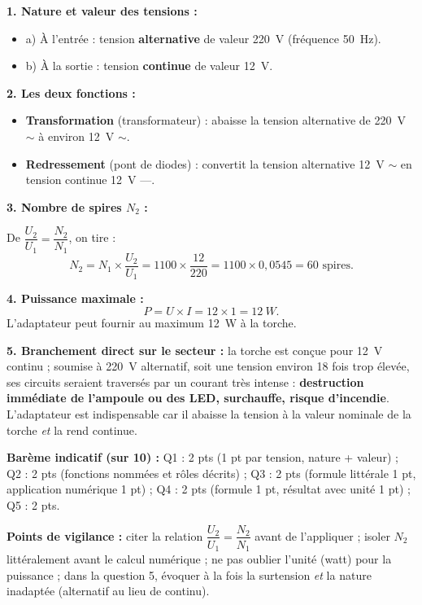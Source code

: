 \documentclass[11pt]{article}
\begin{document}
\begin{corrige}
\textbf{1. Nature et valeur des tensions :}
\begin{itemize}
\item a) À l'entrée : tension \textbf{alternative} de valeur \SI{220}{V} (fréquence \SI{50}{Hz}).
\item b) À la sortie : tension \textbf{continue} de valeur \SI{12}{V}.
\end{itemize}

\textbf{2. Les deux fonctions :}
\begin{itemize}
\item \textbf{Transformation} (transformateur) : abaisse la tension alternative de \SI{220}{V} $\sim$ à environ \SI{12}{V} $\sim$.
\item \textbf{Redressement} (pont de diodes) : convertit la tension alternative \SI{12}{V} $\sim$ en tension continue \SI{12}{V} $\text{---}$.
\end{itemize}

\textbf{3. Nombre de spires $N_2$ :}

De $\dfrac{U_2}{U_1} = \dfrac{N_2}{N_1}$, on tire :
\[
N_2 = N_1 \times \frac{U_2}{U_1} = 1100 \times \frac{12}{220} = 1100 \times 0{,}0545 = 60 \text{ spires}.
\]

\textbf{4. Puissance maximale :}
\[
P = U \times I = 12 \times 1 = \SI{12}{W}.
\]
L'adaptateur peut fournir au maximum \SI{12}{W} à la torche.

\textbf{5. Branchement direct sur le secteur :} la torche est conçue pour \SI{12}{V} continu ; soumise à \SI{220}{V} alternatif, soit une tension environ 18 fois trop élevée, ses circuits seraient traversés par un courant très intense : \textbf{destruction immédiate de l'ampoule ou des LED, surchauffe, risque d'incendie}. L'adaptateur est indispensable car il abaisse la tension à la valeur nominale de la torche \emph{et} la rend continue.

\medskip
\textbf{Barème indicatif (sur 10) :} Q1 : 2 pts (1 pt par tension, nature + valeur) ; Q2 : 2 pts (fonctions nommées et rôles décrits) ; Q3 : 2 pts (formule littérale 1 pt, application numérique 1 pt) ; Q4 : 2 pts (formule 1 pt, résultat avec unité 1 pt) ; Q5 : 2 pts.

\textbf{Points de vigilance :} citer la relation $\dfrac{U_2}{U_1} = \dfrac{N_2}{N_1}$ avant de l'appliquer ; isoler $N_2$ littéralement avant le calcul numérique ; ne pas oublier l'unité (watt) pour la puissance ; dans la question 5, évoquer à la fois la surtension \emph{et} la nature inadaptée (alternatif au lieu de continu).
\end{corrige}
\end{document}
